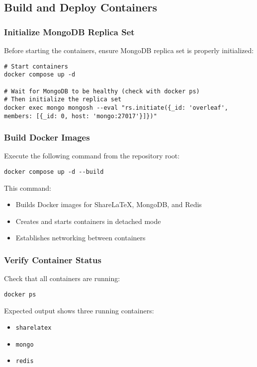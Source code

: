 \subsection{Build and Deploy Containers}

\subsubsection{Initialize MongoDB Replica Set}

Before starting the containers, ensure MongoDB replica set is properly initialized:

\begin{verbatim}
# Start containers
docker compose up -d

# Wait for MongoDB to be healthy (check with docker ps)
# Then initialize the replica set
docker exec mongo mongosh --eval "rs.initiate({_id: 'overleaf', members: [{_id: 0, host: 'mongo:27017'}]})"
\end{verbatim}

\subsubsection{Build Docker Images}

Execute the following command from the repository root:

\begin{verbatim}
docker compose up -d --build
\end{verbatim}

This command:
\begin{itemize}
    \item Builds Docker images for ShareLaTeX, MongoDB, and Redis
    \item Creates and starts containers in detached mode
    \item Establishes networking between containers
\end{itemize}

\subsubsection{Verify Container Status}

Check that all containers are running:

\begin{verbatim}
docker ps
\end{verbatim}

Expected output shows three running containers:
\begin{itemize}
    \item \texttt{sharelatex}
    \item \texttt{mongo}
    \item \texttt{redis}
\end{itemize}

